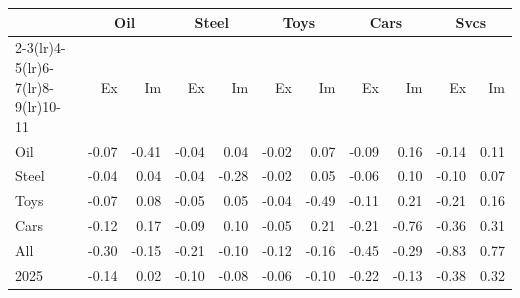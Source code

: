 \begin{tabular}{lrrrrrrrrrr}
\toprule
 & \multicolumn{2}{c}{Oil} & \multicolumn{2}{c}{Steel} & \multicolumn{2}{c}{Toys} & \multicolumn{2}{c}{Cars} & \multicolumn{2}{c}{Svcs} \\
\cmidrule(lr){2-3}\cmidrule(lr){4-5}\cmidrule(lr){6-7}\cmidrule(lr){8-9}\cmidrule(lr){10-11}
 & Ex & Im & Ex & Im & Ex & Im & Ex & Im & Ex & Im \\
\midrule
Oil & -0.07 & -0.41 & -0.04 & 0.04 & -0.02 & 0.07 & -0.09 & 0.16 & -0.14 & 0.11 \\
Steel & -0.04 & 0.04 & -0.04 & -0.28 & -0.02 & 0.05 & -0.06 & 0.10 & -0.10 & 0.07 \\
Toys & -0.07 & 0.08 & -0.05 & 0.05 & -0.04 & -0.49 & -0.11 & 0.21 & -0.21 & 0.16 \\
Cars & -0.12 & 0.17 & -0.09 & 0.10 & -0.05 & 0.21 & -0.21 & -0.76 & -0.36 & 0.31 \\
All & -0.30 & -0.15 & -0.21 & -0.10 & -0.12 & -0.16 & -0.45 & -0.29 & -0.83 & 0.77 \\
2025 & -0.14 & 0.02 & -0.10 & -0.08 & -0.06 & -0.10 & -0.22 & -0.13 & -0.38 & 0.32 \\
\bottomrule
\end{tabular}
